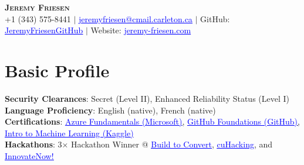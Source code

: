 \documentclass[letterpaper,11pt]{article}
\begin{document}

\begin{center}
    \textbf{\Huge \scshape Jeremy Friesen} \\ \vspace{5pt}
    \small +1 (343) 575-8441 $|$ 
    \href{mailto:jeremyfriesen@cmail.carleton.ca}{\textcolor{blue}{\underline{jeremyfriesen@cmail.carleton.ca}}} $|$ 
    GitHub: \href{https://github.com/JeremyFriesenGitHub}{\textcolor{blue}{\underline{JeremyFriesenGitHub}}}  $|$ 
    Website: \href{https://jeremy-friesen.com}{\textcolor{blue}{\underline{jeremy-friesen.com}}}
\end{center}


\section{Basic Profile}
 \begin{itemize}[leftmargin=0.15in, label={}]
    \small{\item{
    \textbf{Security Clearances}{: Secret (Level II), Enhanced Reliability Status (Level I)} \\
    \textbf{Language Proficiency}{: English (native), French (native)} \\
     \textbf{Certifications}{:
    \href{https://learn.microsoft.com/api/credentials/share/en-us/JeremyFriesen-3056/7578B454E676563E?sharingId=8B36EC9151BBF3F1}{\textcolor{blue}{\underline{Azure Fundamentals (Microsoft)}},}
    \href{https://www.credly.com/badges/aab96fc1-decd-4a72-a4af-bc3a9bd72279/public_url}{\textcolor{blue}{\underline{GitHub Foundations (GitHub)}},} 
    \href{https://www.kaggle.com/learn/certification/jeremyfriesen123/intro-to-machine-learning}{\textcolor{blue}{\underline{Intro to Machine Learning (Kaggle)}}}
     } \\
\textbf{Hackathons}{: 3× Hackathon Winner @ 
\href{https://luma.com/9k96tg5z}{\textcolor{blue}{\underline{Build to Convert}}}, 
\href{https://devpost.com/software/cu-tunnels}{\textcolor{blue}{\underline{cuHacking}}}, and 
\href{https://sssc.carleton.ca/events/2023/innovatenow}{\textcolor{blue}{\underline{InnovateNow!}}}}

 
 }}
 \end{itemize}
 
\end{document}
